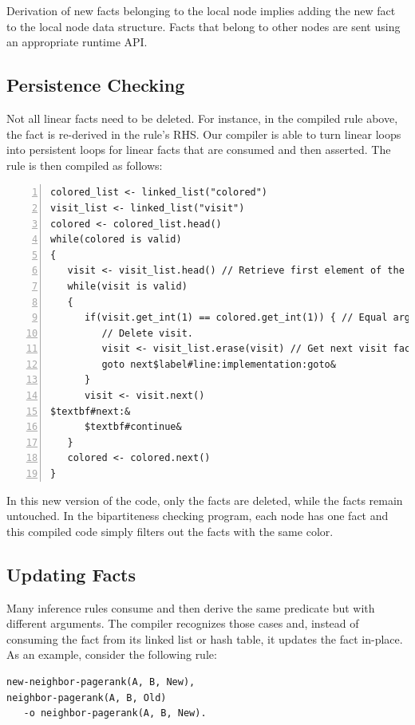 Derivation of new facts belonging to the local node implies adding the new fact
to the local node data structure. Facts that belong to other nodes are sent
using an appropriate runtime API.

\subsection{Persistence Checking}

Not all linear facts need to be deleted. For instance, in the compiled rule
above, the fact  is re-derived in the rule's RHS.  Our
compiler is able to turn linear loops into persistent loops for linear facts
that are consumed and then asserted. The rule is then compiled as follows:

\begin{Verbatim}[numbers=left,fontsize=\codesize,commandchars=\$\#\&]
colored_list <- linked_list("colored")
visit_list <- linked_list("visit")
colored <- colored_list.head()
while(colored is valid)
{
   visit <- visit_list.head() // Retrieve first element of the list.
   while(visit is valid)
   {
      if(visit.get_int(1) == colored.get_int(1)) { // Equal arguments?
         // Delete visit.
         visit <- visit_list.erase(visit) // Get next visit fact.
         goto next$label#line:implementation:goto&
      }
      visit <- visit.next()
$textbf#next:&
      $textbf#continue&
   }
   colored <- colored.next()
}
\end{Verbatim}

In this new version of the code, only the  facts are deleted, while
the  facts remain untouched. In the bipartiteness checking
program, each node has one  fact and this compiled code simply
filters out the  facts with the same color.

\subsection{Updating Facts}

Many inference rules consume and then derive the same predicate but with
different arguments. The compiler recognizes those cases and, instead of
consuming the fact from its linked list or hash table, it updates the fact
in-place. As an example, consider the following rule:

\begin{Verbatim}[fontsize=\codesize]
new-neighbor-pagerank(A, B, New),
neighbor-pagerank(A, B, Old)
   -o neighbor-pagerank(A, B, New).
\end{Verbatim}

